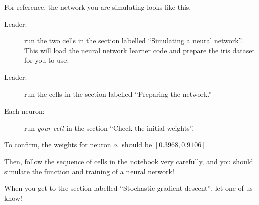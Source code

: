 \documentclass[11pt]{article}
\begin{document}
For reference, the network you are simulating looks like this.
\begin{center}
\end{center}

\begin{description}
\item[Leader:]
  run the two cells in the section labelled ``Simulating a neural
  network''. This will load the neural network learner code and prepare the
  iris dataset for you to use.
\item[Leader:]
  run the cells in the section labelled ``Preparing the network.''
\item[Each neuron:]
  run \emph{your cell} in the section ``Check the initial weights''.
\end{description}

To confirm, the weights for neuron $o_1$ should be $[0.3968, 0.9106]$.

Then, follow the sequence of cells in the notebook very carefully, and you
should simulate the function and training of a neural network!

When you get to the section labelled ``Stochastic gradient descent'', let one of
us know!
\end{document}
